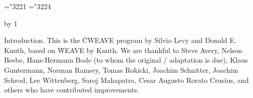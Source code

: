 






\def\hang{\hangindent 3em\indent\ignorespaces}
\def\pb{$\.|\ldots\.|$} %
\def\v{\char'174} %
\def\dleft{[\![} \def\dright{]\!]} %
\mathchardef\RA="3221 %
\mathchardef\BA="3224 %
\def\TeXxstring{\\{\TEX/\_string}}
\def\skipxTeX{\\{skip\_\TEX/}}
\def\copyxTeX{\\{copy\_\TEX/}}

\def\title{CWEAVE (Version 4.12.2)}
\def\topofcontents{\null\vfill
  \centerline{\titlefont The {\ttitlefont CWEAVE} processor}
  \vskip 15pt
  \centerline{(Version 4.12.2)}
  \vfill}
\def\botofcontents{\vfill\titlefalse}
\def\contentspagenumber{109}
\def\title{APPENDIX F: CWEAVE}
\let\K=\leftarrow
\pageno=\contentspagenumber \advance\pageno by 1
\let\maybe=\iftrue


Introduction.
This is the \.{CWEAVE} program by Silvio Levy and Donald E. Knuth,
based on \.{WEAVE} by Knuth.
We are thankful to Steve Avery,
Nelson Beebe, Hans-Hermann Bode (to whom the original \CPLUSPLUS/ adaptation
is due), Klaus Guntermann, Norman Ramsey, Tomas Rokicki, Joachim Schnitter,
Joachim Schrod, Lee Wittenberg, Saroj Mahapatra, Cesar Augusto Rorato
Crusius, and others who have contributed improvements.

